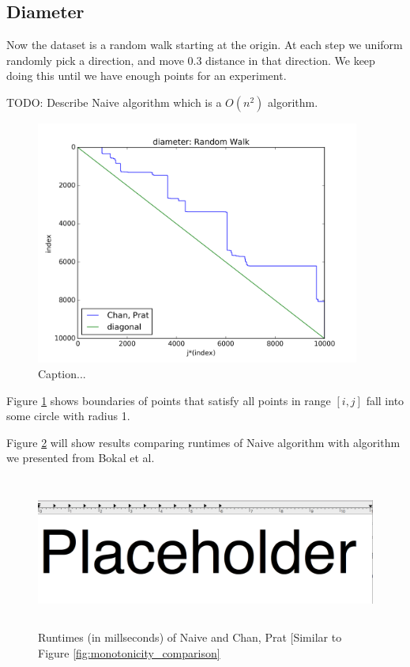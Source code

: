 \documentclass{article}
\begin{document}
\subsection{Diameter}

Now the dataset is a random walk starting at the origin. At each step we uniform randomly pick a direction, and move 0.3 distance in that direction. We keep doing this until we have enough points for an experiment.

TODO: Describe Naive algorithm which is a $O(n^2)$ algorithm.

\begin{figure}[!h]
  \centering
  \includegraphics[height=8cm]{../plots/diameter_random_walk}
  \caption{Caption...}
  \label{fig:diameter_demo}
\end{figure}

Figure \ref{fig:diameter_demo} shows boundaries of points that satisfy all points in range $[i, j]$ fall into some circle with radius 1.

Figure \ref{fig:diameter_comparison} will show results comparing runtimes of Naive algorithm with algorithm we presented from Bokal et al.
\begin{figure}[!ht]
  \centering
  \includegraphics[height=5cm]{../plots/diameter_comparison}
  \caption{Runtimes (in millseconds) of Naive and Chan, Prat [Similar to Figure \ref{fig:monotonicity_comparison}}
  \label{fig:diameter_comparison}
\end{figure}
\end{document}
